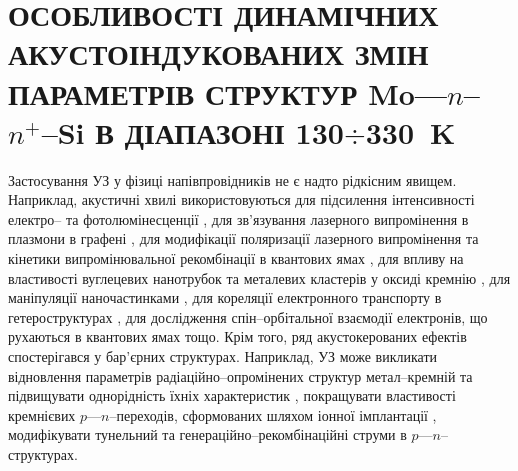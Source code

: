 \chapter{\MakeUppercase{Особливості динамічних акустоіндукованих змін параметрів
 структур} Mo---$n$--$n^+$--Si \MakeUppercase{в діапазоні 130$\div$330~K}\label{Ch_USL_T_SD}}

Застосування УЗ у фізиці напівпровідників не є надто рідкісним явищем.
Наприклад, акустичні хвилі використовуються для підсилення інтенсивності
електро-- \cite{Wang:JLum} та фотолюмінесценції \cite{Bahar2003,ZobovFTP2008},
для зв'язування лазерного випромінення в плазмони в графені \cite{Schiefele:2011},
для модифікації поляризації лазерного випромінення \cite{Kulakova:2012SSC} та
кінетики випромінювальної рекомбінації в квантових ямах \cite{Ostrovskii2001},
для впливу на властивості вуглецевих нанотрубок \cite{Pandey:2014}
та металевих кластерів у оксиді кремнію \cite{Roman:2006JAP,Roman:2007APL},
для маніпуляції наночастинками \cite{Bart:2011},
для кореляції електронного транспорту в гетероструктурах \cite{Buyukkose:2013,He:2010},
для дослідження спін--орбітальної взаємодії електронів, що рухаються в квантових ямах \cite{Sanada:2011} тощо.
Крім того, ряд акустокерованих ефектів спостерігався у бар'єрних структурах.
Наприклад, УЗ може викликати відновлення параметрів радіаційно--опромінених \cite{Gorb2010} структур метал--кремній та підвищувати
однорідність їхніх характеристик \cite{Olikh:PZTF2006},
покращувати властивості кремнієвих $p$---$n$--переходів, сформованих шляхом іонної імплантації \cite{YOlikh2005},
модифікувати тунельний \cite{Teterkin2009r} та генераційно--рекомбінаційні \cite{Davletova2009,Davletova2008} струми в $p$---$n$--структурах.

